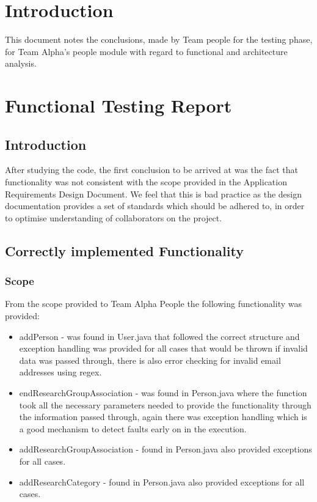 \documentclass{article}
\begin{document}
\tableofcontents
\thispagestyle{empty}
\cleardoublepage

\setcounter{page}{1}
\section{Introduction}
This document notes the conclusions, made by Team people for the testing phase, for Team Alpha's people module with regard to functional and architecture analysis. \\

\newpage

\section{Functional Testing Report}
	\subsection{Introduction}
	After studying the code, the first conclusion to be arrived at was the fact that functionality was not consistent with the scope provided in the Application Requirements Design Document. We feel that this is bad practice as the design documentation provides a set of standards which should be adhered to, in order to optimise understanding of collaborators on the project.\\

	\subsection{Correctly implemented Functionality}
	\subsubsection{Scope}
	From the scope provided to Team Alpha People the following functionality was provided:
	\begin{itemize}
		\item addPerson - was found in User.java that followed the correct structure and exception handling was provided for all cases that would be thrown if invalid data was passed through, there is also error checking for invalid email addresses using regex.
		\item endResearchGroupAssociation - was found in Person.java where the function took all the necessary parameters needed to provide the functionality through the information passed through, again there was exception handling which is a good mechanism to detect faults early on in the execution.
		\item addResearchGroupAssociation - found in Person.java also provided exceptions for all cases.
		\item addResearchCategory - found in Person.java also provided exceptions for all cases.
		
	\end{itemize}
	
\end{document}
